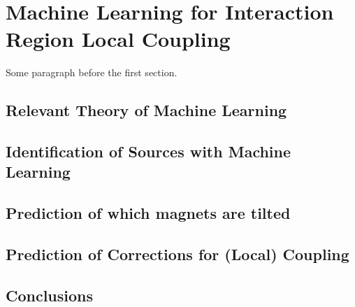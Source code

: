 
\chapter{Machine Learning for Interaction Region Local Coupling} %

\label{Chapter4} %




Some paragraph before the first section.


\section{Relevant Theory of Machine Learning}


\section{Identification of Sources with Machine Learning}


\section{Prediction of which magnets are tilted}


\section{Prediction of Corrections for (Local) Coupling}


\section{Conclusions}

